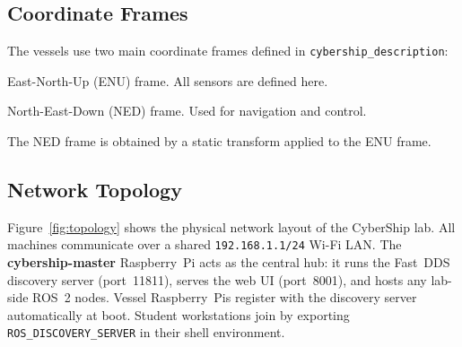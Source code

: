 \documentclass[12pt,a4paper]{article}
\begin{document}
	\subsection{Coordinate Frames}
	
	The vessels use two main coordinate frames defined in \texttt{cybership\_description}:
	
	\begin{description}[leftmargin=3.5cm]
		\item[\texttt{base\_link}] East-North-Up (ENU) frame. All sensors are defined here.
		\item[\texttt{base\_link\_ned}] North-East-Down (NED) frame. Used for navigation and control.
	\end{description}
	
	The NED frame is obtained by a static transform applied to the ENU frame.
	
	\subsection{Network Topology}
	
	Figure~\ref{fig:topology} shows the physical network layout of the CyberShip lab. All machines
	communicate over a shared \texttt{192.168.1.1/24} Wi-Fi LAN. The \textbf{cybership-master}
	Raspberry~Pi acts as the central hub: it runs the Fast~DDS discovery server (port~11811),
	serves the web UI (port~8001), and hosts any lab-side ROS~2 nodes. Vessel Raspberry~Pis register
	with the discovery server automatically at boot. Student workstations join by exporting
	\texttt{ROS\_DISCOVERY\_SERVER} in their shell environment.
	
\end{document}
